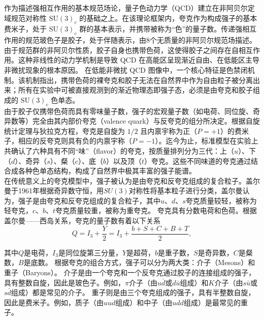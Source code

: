作为描述强相互作用的基本规范场论，量子色动力学（QCD）建立在非阿贝尔定域规范对称性 $\mathrm{SU}(3)_c$ 的基础之上。在该理论框架内，夸克作为构成强子的基本费米子，处于 $\mathrm{SU}(3)_c$ 群的基本表示，并携带被称为“色”的量子数。传递强相互作用的规范玻色子是胶子，处于伴随表示，由8个无质量的非阿贝尔规范场描述。由于规范群的非阿贝尔性质，胶子自身也携带色荷，这使得胶子之间存在自相互作用。这种非线性的动力学机制是导致 QCD 在高能区呈现渐近自由、在低能区主导非微扰现象的根本原因。
在低能非微扰 QCD 图像中，一个核心特征是色禁闭机制。该机制指出，携带色荷的裸夸克和胶子无法在自然界中作为自由粒子被分离出来；所有在实验中可被直接观测到的渐近物理态即强子态，必须是由夸克和胶子组成的 $\mathrm{SU}(3)_c$ 色单态。\\

由于胶子仅携带色荷而具有零味量子数，强子的宏观量子数（如电荷、同位旋、奇异数等）完全由其内部价夸克（valence quark）与反夸克的组分所决定。根据自旋统计定理与狄拉克方程，夸克是自旋为 $1/2$ 且内禀宇称为正（$P=+1$）的费米子，相应的反夸克则具有负的内禀宇称（$P=-1$）。迄今为止，标准模型在实验上共确认了六种具有不同“味”（flavor）的夸克，按质量排列分为三代：上（$u$）、下（$d$）、奇异（$s$）、粲（$c$）、底（$b$）以及顶（$t$）夸克。这些不同味道的夸克通过结合成各种色单态结构，构成了自然界中极其丰富的强子能谱。\\

在传统意义上的夸克模型中，强子被认为是由夸克和反夸克组成的复合粒子。盖尔曼于1961年根据奇异数守恒，用$SU(3)$对称性将基本粒子进行分类，盖尔曼认为，强子是由夸克和反夸克组成的复合粒子，其中$u、d、s$夸克质量较轻，被称为轻夸克，$c、b、t$夸克质量较重，被称为重夸克。
夸克具有分数电荷和色荷。根据盖尔曼——西岛关系，夸克的量子数有着以下关系
\vspace{0.5cm}
\begin{equation}
    Q = I_3 + \frac{Y}{2} = I_3 + \frac{b+S+C+B+T}{2} ,
\end{equation}

其中$Q$是电荷，$I_3$是同位旋第三分量，$Y$是超荷，$b$是重子数，$S$是奇异数，$C$是粲数，$B$是底数。
根据夸克的组合方式，强子可以分为两大类：介子（Mesons）和重子（Baryons）。
介子是由一个夸克和一个反夸克通过胶子的连接组成的强子，具有整数自旋，因此是玻色子。例如，$\pi$介子（由$u\bar{d}$或$d\bar{u}$组成）和$K$介子（由$s\bar{u}$或$s\bar{d}$组成）都是常见的介子。
重子则是由三个夸克组成的强子，具有半整数自旋，因此是费米子。例如，质子（由$uud$组成）和中子（由$udd$组成）是最常见的重子。


